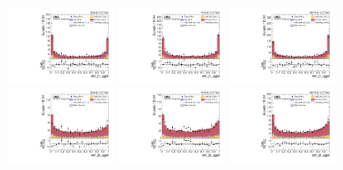 \begin{figure}[!ht]
  \includegraphics[width=0.25\textwidth]{analysis_plots/2016_zv/sr_l/vbf_j1_qgid.pdf} \hspace{-12pt}
  \includegraphics[width=0.25\textwidth]{analysis_plots/2017_zv/sr_l/vbf_j1_qgid.pdf} \hspace{-12pt}
  \includegraphics[width=0.25\textwidth]{analysis_plots/2018_zv/sr_l/vbf_j1_qgid.pdf} \hspace{-12pt} \\ \vspace{-5pt}
  \includegraphics[width=0.25\textwidth]{analysis_plots/2016_zv/sr_l/vbf_j2_qgid.pdf} \hspace{-12pt}
  \includegraphics[width=0.25\textwidth]{analysis_plots/2017_zv/sr_l/vbf_j2_qgid.pdf} \hspace{-12pt}
  \includegraphics[width=0.25\textwidth]{analysis_plots/2018_zv/sr_l/vbf_j2_qgid.pdf} \hspace{-12pt} \\ \vspace{-5pt}

\end{figure}
